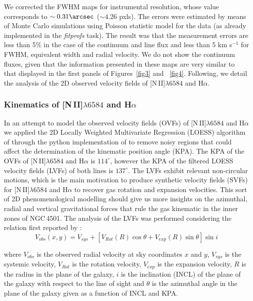 \documentclass[fleqn,usenatbib]{mnras}
\begin{document}
We corrected the FWHM maps for instrumental resolution, whose value corresponds to $\sim 0.31\arcsec$ ($\sim 4.26$ pxls). The errors were estimated by means 
of Monte Carlo simulations using Poisson statistic model for the data (as already implemented in the {\it fitprofs} task). The result was that the measurement 
errors are less than 5$\%$ in the case of the continuum and line flux and less than 5 km s$^{-1}$ for FWHM, equivalent width and radial velocity. 
We do not show the continuum fluxes, given that the information presented in these maps are very similar to that displayed in the first panels of Figures~\ref{fig3} 
and ~\ref{fig4}. Following, we detail the analysis of the 2D observed velocity fields of \hbox{[N\,II]$\lambda6584$} and H$\alpha$. 

\subsubsection{Kinematics of \hbox{[N\,II]$\lambda6584$} and H$\alpha$}\label{sec:s5}

In an attempt to model the observed velocity fields (OVFs) of \hbox{[N\,II]$\lambda6584$} and H$\alpha$ we applied 
the 2D Locally Weighted Multivariate Regression (LOESS) algorithm of \citet{Cleveland1988} through the python implementation of \citet{Cappellari2013}
to remove noisy regions that could affect the determination of the kinematic position angle (KPA). The KPA of
the OVFs of \hbox{[N\,II]$\lambda6584$} and H$\alpha$ is $114^{\circ}$, however the KPA of the filtered LOESS velocity fields (LVFs) of both lines is 
$137^{\circ}$. The LVFs exhibit relevant non-circular motions, which is the main motivation to produce synthetic velocity fields (SVFs) for
\hbox{[N\,II]$\lambda6584$} and H$\alpha$ to recover gas rotation and expansion velocities. This sort of 2D phenomenological modelling should give us more
insights on the azimuthal, radial and vertical gravitational forces that rule the gas kinematic in the inner zones of NGC\,4501. The analysis of the LVFs was performed 
considering the relation first reported by \citet{Rogstad1971}:
\begin{equation}\label{eqn:e1}
V_{obs}(x,y)=V_{sys}+\left[V_{Rot}(R)\cos{\theta}+V_{exp}(R)\sin{\theta}\right]\sin{i}
\end{equation}

\noindent where $V_{obs}$ is the observed radial velocity at sky coordinates $x$ and $y$, $V_{sys}$ is the systemic velocity, $V_{Rot}$ is the rotation velocity, $V_{exp}$ is the 
expansion velocity, $R$ is the radius in the plane of the galaxy, $i$ is the inclination (INCL) of the plane of the galaxy with respect to the line of sight and $\theta$ is the 
azimuthal angle in the plane of the galaxy given as a function of INCL and KPA. 
\end{document}
